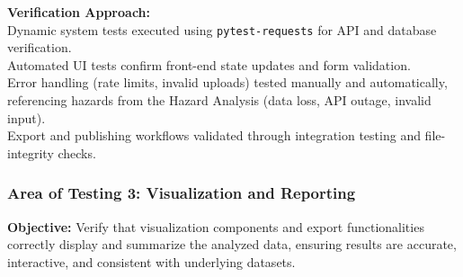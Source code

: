 \documentclass[12pt, titlepage]{article}
\begin{document}
\noindent\textbf{Verification Approach:}\\
Dynamic system tests executed using \texttt{pytest-requests} for API and database verification.\\
Automated UI tests confirm front-end state updates and form validation.\\
Error handling (rate limits, invalid uploads) tested manually and automatically, referencing hazards from the Hazard Analysis (data loss, API outage, invalid input).\\
Export and publishing workflows validated through integration testing and file-integrity checks.\\[0.5em]

\subsubsection{Area of Testing 3: Visualization and Reporting}
\textbf{Objective:} Verify that visualization components and export functionalities correctly display and summarize the analyzed data, ensuring results are accurate, interactive, and consistent with underlying datasets.
\end{document}
